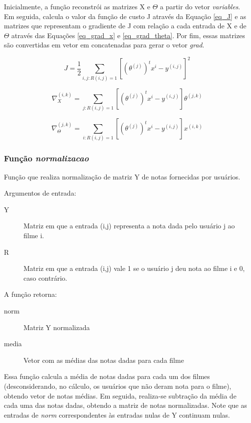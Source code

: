 \documentclass[12pt]{article}
\begin{document}
Inicialmente, a função reconstrói as matrizes X e $\Theta$ a partir do vetor \textit{variables}. Em seguida, calcula o valor da função de custo J através da Equação \ref{eq_J} e as matrizes  que representam o gradiente de J com relação a cada entrada de X e de $\Theta$ através das Equações \ref{eq_grad_x} e \ref{eq_grad_theta}. Por fim, essas matrizes são convertidas em vetor em concatenadas para gerar o vetor \textit{grad}. 

\begin{equation} \label{eq_J}
J = \frac{1}{2} \sum_{i,j: R(i,j) = 1} \left[\left(\theta^{(j)}\right)^t x^i - y^{(i,j)}\right]^2 
\end{equation}

\begin{equation} \label{eq_grad_x}
\nabla_X^{(i,k)} = \sum_{j:R(i,j)=1} \left[\left(\theta^{(j)}\right)^t x^i - y^{(i,j)}\right]\theta^{(j,k)}
\end{equation}

\begin{equation} \label{eq_grad_theta}
\nabla_{\Theta}^{(j,k)} = \sum_{i:R(i,j)=1} \left[\left(\theta^{(j)}\right)^t x^i - y^{(i,j)}\right]x^{(i,k)}
\end{equation}

\subsubsection{Função \textit{normalizacao}}
Função que realiza normalização de matriz Y de notas fornecidas por usuários.

Argumentos de entrada:

\begin{description}
\item[Y] Matriz em que a entrada (i,j) representa a nota dada pelo usuário j ao filme i.
\item[R] Matriz em que a entrada (i,j) vale 1 se o usuário j deu nota ao filme i e 0, caso contrário.
\end{description}

A função retorna:

\begin{description}
\item[norm] Matriz Y normalizada
\item[media] Vetor com as médias das notas dadas para cada filme
\end{description}

Essa função calcula a média de notas dadas para cada um dos filmes (desconsiderando, no cálculo, os usuários que não deram nota para o filme), obtendo vetor de notas médias. Em seguida, realiza-se subtração da média de cada uma das notas dadas, obtendo a matriz de notas normalizadas. Note que as entradas de \textit{norm} correspondentes às entradas nulas de Y continuam nulas.
\end{document}
